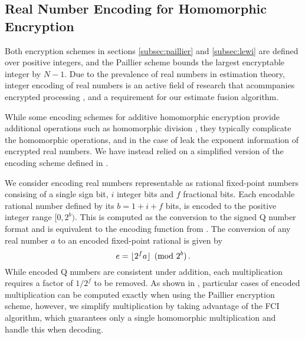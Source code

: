 \documentclass[letterpaper, 10 pt, conference]{ieeeconf}  %
\begin{document}
\subsection{Real Number Encoding for Homomorphic Encryption} \label{subsec:encoding}
Both encryption schemes in sections \ref{subsec:paillier} and \ref{subsec:lewi} are defined over positive integers, and the Paillier scheme bounds the largest encryptable integer by $N-1$. Due to the prevalence of real numbers in estimation theory, integer encoding of real numbers is an active field of research that acommpanies encrypted processing \cite{ziadCryptoImgPrivacyPreserving2016,farokhiSecurePrivateControl2017,cheonHomomorphicEncryptionArithmetic2017}, and a requirement for our estimate fusion algorithm. 

While some encoding schemes for additive homomorphic encryption provide additional operations such as homomorphic division \cite{ziadCryptoImgPrivacyPreserving2016}, they typically complicate the homomorphic operations, and in the case of \cite{ziadCryptoImgPrivacyPreserving2016} leak the exponent information of encrypted real numbers. We have instead relied on a simplified version of the encoding scheme defined in \cite{farokhiSecurePrivateControl2017}. 

We consider encoding real numbers representable as rational fixed-point numbers consising of a single sign bit, $i$ integer bits and $f$ fractional bits. Each encodable rational number defined by its $b=1+i+f$ bits, is encoded to the positive integer range $[0,2^b)$. This is computed as the conversion to the signed Q number format \cite{oberstarFixedPointRepresentationFractional2007} and is equivalent to the encoding function from \cite{farokhiSecurePrivateControl2017}. The conversion of any real number $a$ to an encoded fixed-point rational is given by
\begin{equation}
   e = \lfloor{2^f a}\rfloor\pmod{2^b}\,. \label{eqn:qmn}
\end{equation}
While encoded Q numbers are consistent under addition, each multiplication requires a factor of $1/2^f$ to be removed. As shown in \cite{farokhiSecurePrivateControl2017}, particular cases of encoded multiplication can be computed exactly when using the Paillier encryption scheme, however, we simplify multiplication by taking advantage of the FCI algorithm, which guarantees only a single homomorphic multiplication and handle this when decoding.
\end{document}
